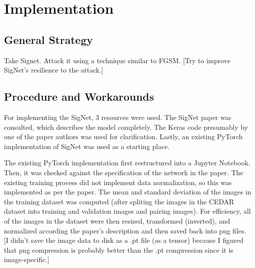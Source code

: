 \section{Implementation}\label{sec:implementation}


\subsection{General Strategy}

Take Signet.
Attack it using a technique similar to FGSM.
[Try to improve SigNet's resilience to the attack.]


\subsection{Procedure and Workarounds}

For implementing the SigNet, 3 resources were used.
The SigNet paper was consulted, which describes the model completely\cite{sig_net}.
The Keras code presumably by one of the paper authors was used for clarification\cite{GitHub_sounakdey}.
Lastly, an existing PyTorch implementation of SigNet was used as a starting place\cite{GitHub_signet_pytorch}.

The existing PyTorch implementation first restructured into a Jupyter Notebook.
Then, it was checked against the specification of the network in the paper.
The existing training process did not implement data normalization, so this was implemented as per the paper.
The mean and standard deviation of the images in the training dataset was computed (after spliting the images in the CEDAR dataset into training and validation images and pairing images).
For efficiency, all of the images in the dataset were then resized, transformed (inverted), and normalized according the paper's description and then saved back into png files.
[I didn't save the image data to disk as a .pt file (as a tensor) because I figured that png compression is probably better than the .pt compression since it is image-specific.]


